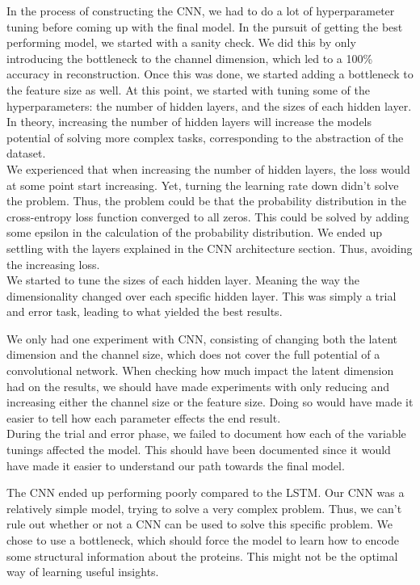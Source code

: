 In the process of constructing the CNN, we had to do a lot of hyperparameter tuning before coming up with the final model. In the pursuit of getting the best performing model, we started with a sanity check. We did this by only introducing the bottleneck to the channel dimension, which led to a 100\% accuracy in reconstruction. Once this was done, we started adding a bottleneck to the feature size as well. At this point, we started with tuning some of the hyperparameters: the number of hidden layers, and the sizes of each hidden layer. \\

\noindent
In theory, increasing the number of hidden layers will increase the models potential of solving more complex tasks, corresponding to the abstraction of the dataset.\\

\noindent
We experienced that when increasing the number of hidden layers, the loss would at some point start increasing. Yet, turning the learning rate down didn't solve the problem. Thus, the problem could be that the probability distribution in the cross-entropy loss function converged to all zeros. This could be solved by adding some epsilon in the calculation of the probability distribution. We ended up settling with the layers explained in the CNN architecture section. Thus, avoiding the increasing loss. \\

\noindent
We started to tune the sizes of each hidden layer. Meaning the way the dimensionality changed over each specific hidden layer. This was simply a trial and error task, leading to what yielded the best results.

\noindent
We only had one experiment with CNN, consisting of changing both the latent dimension and the channel size, which does not cover the full potential of a convolutional network. When checking how much impact the latent dimension had on the results, we should have made experiments with only reducing and increasing either the channel size or the feature size. Doing so would have made it easier to tell how each parameter effects the end result. \\

\noindent
During the trial and error phase, we failed to document how each of the variable tunings affected the model. This should have been documented since it would have made it easier to understand our path towards the final model.

\noindent
The CNN ended up performing poorly compared to the LSTM. Our CNN was a relatively simple model, trying to solve a very complex problem. Thus, we can't rule out whether or not a CNN can be used to solve this specific problem. We chose to use a bottleneck, which should force the model to learn how to encode some structural information about the proteins. This might not be the optimal way of learning useful insights.